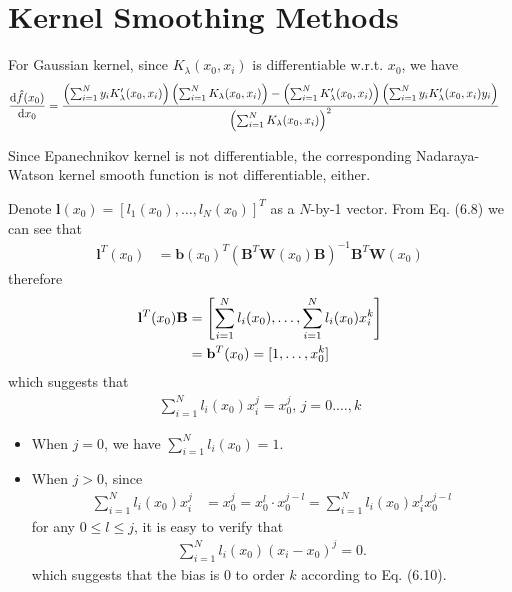 \chapter{Kernel Smoothing Methods}
\label{ch:6}

\begin{exercise}
  For Gaussian kernel, since $K_{\lambda}(x_0,x_i)$ is differentiable w.r.t.
  $x_0$, we have
  \begin{align}
    \dv{\hat{f}(x_0)}{x_0} &= \frac{\left(\sum_{i=1}^Ny_iK'_{\lambda}(x_0,
    x_i)\right) \left(\sum_{i=1}^NK_{\lambda}(x_0,
    x_i)\right) - \left(\sum_{i=1}^NK'_{\lambda}(x_0,
    x_i)\right)\left(\sum_{i=1}^Ny_iK'_{\lambda}(x_0,
    x_i)y_i\right)} {\left(\sum_{i=1}^NK_{\lambda}(x_0,
    x_i)\right)^2}
  \end{align}
  
  Since Epanechnikov kernel is not differentiable, the corresponding
  Nadaraya-Watson kernel smooth function is not differentiable, either.
\end{exercise}

\begin{exercise}
  Denote $\mathbf{l}(x_0) = [l_1(x_0),\ldots,l_N(x_0)]^T$ as a $N$-by-1 vector.
  From Eq. (6.8) we can see that
  \begin{align}
    \mathbf{l}^T(x_0) &= \mathbf{b}(x_0)^T
    \left(\mathbf{B}^T\mathbf{W}(x_0)\mathbf{B}\right)^{-1}
    \mathbf{B}^T\mathbf{W}(x_0)
  \end{align}
  therefore
  \begin{align}
    \mathbf{l}^T(x_0)\mathbf{B} &= \left[\sum_{i=1}^Nl_i(x_0),\ldots,
    \sum_{i=1}^Nl_i(x_0)x_i^{k}\right] \notag\\
    &= \mathbf{b}^T(x_0) = [1, \ldots, x_0^{k}]
  \end{align}
  which suggests that 
  \begin{align}
    \sum_{i=1}^Nl_i(x_0)x_i^{j} = x_0^j,\,j=0.\ldots,k
  \end{align}
  \begin{itemize}
    \item When $j=0$, we have $\sum_{i=1}^Nl_i(x_0) = 1$.
    \item When $j>0$, since 
    \begin{align}
      \sum_{i=1}^Nl_i(x_0)x_i^{j} &= x_0^j  = x_0^l\cdot x_0^{j-l} =
      \sum_{i=1}^Nl_i(x_0)x_i^{l}x_0^{j-l}
    \end{align}
    for any $0\leq l\leq j$, it is easy to verify that 
    \begin{align}
      \sum_{i=1}^Nl_i(x_0)(x_i - x_0)^j = 0.
    \end{align}
    which suggests that the bias is 0 to order $k$ according to Eq. (6.10). 
  \end{itemize}
  
\end{exercise}

